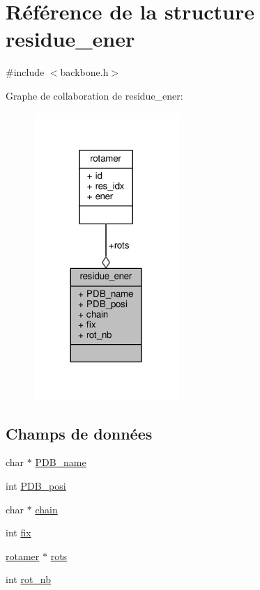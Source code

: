 \hypertarget{structresidue__ener}{\section{Référence de la structure residue\+\_\+ener}
\label{structresidue__ener}
}


{\ttfamily \#include $<$backbone.\+h$>$}



Graphe de collaboration de residue\+\_\+ener\+:\nopagebreak
\begin{figure}[H]
\begin{center}
\leavevmode
\includegraphics[width=156pt]{structresidue__ener__coll__graph}
\end{center}
\end{figure}
\subsection*{Champs de données}
\begin{DoxyCompactItemize}
\item 
char $\ast$ \hyperlink{structresidue__ener_a7e85379b061364b7f493461007527e04}{P\+D\+B\+\_\+name}
\item 
int \hyperlink{structresidue__ener_a4f3b73824bf80117bce4dd2accd0275d}{P\+D\+B\+\_\+posi}
\item 
char $\ast$ \hyperlink{structresidue__ener_a348a18ae3886f0d0cc5a4e7ce5ca5609}{chain}
\item 
int \hyperlink{structresidue__ener_a54b07491f3ee48a3b93fc9bbe9e64e51}{fix}
\item 
\hyperlink{structrotamer}{rotamer} $\ast$ \hyperlink{structresidue__ener_af19665d2d44e75b3cdce0354151bf40b}{rots}
\item 
int \hyperlink{structresidue__ener_a36eee97018204ef62d6e0f3cd31926f4}{rot\+\_\+nb}
\end{DoxyCompactItemize}


